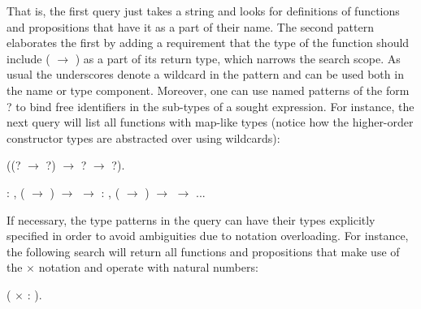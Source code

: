 That is, the first  query just takes a string and looks for
definitions of functions and propositions that have it as a part of
their name. The second pattern elaborates the first by adding a
requirement that the type of the function should include (\coqdocvar{\_} \ensuremath{\rightarrow} 
\coqdocvar{\_}) as a part of its return type, which narrows the search scope. As usual the
underscores \coqdocvar{\_} denote a wildcard in the pattern and can be used both
in the name or type component. Moreover, one can use named patterns of
the form ? to bind free identifiers in the sub-types of a sought
expression. For instance, the next query will list all functions with
map-like types (notice how the higher-order constructor types are
abstracted over using wildcards):
\begin{coqdoccode}
\coqdocemptyline
\coqdocnoindent
{} \coqdocvar{\_} ((? \ensuremath{\rightarrow} ?) \ensuremath{\rightarrow} \coqdocvar{\_} ? \ensuremath{\rightarrow} \coqdocvar{\_} ?).\coqdoceol
\end{coqdoccode}
\coqdoceol
\coqdocemptyline
\coqdocnoindent
{}  \coqdockw{\ensuremath{\forall}}   : , ( \ensuremath{\rightarrow} ) \ensuremath{\rightarrow}   \ensuremath{\rightarrow}  \coqdoceol
\coqdocnoindent
{}  \coqdockw{\ensuremath{\forall}}   : , ( \ensuremath{\rightarrow} ) \ensuremath{\rightarrow}   \ensuremath{\rightarrow}  \coqdoceol
\coqdocnoindent
...

\coqdocemptyline


If necessary, the type patterns in the query can have their types
explicitly specified in order to avoid ambiguities due to notation
overloading. For instance, the following search will return all
functions and propositions that make use of the \coqdocvar{\_} \ensuremath{\times} \coqdocvar{\_} notation and
operate with natural numbers: \begin{coqdoccode}
\coqdocemptyline
\coqdocnoindent
{} \coqdocvar{\_} (\coqdocvar{\_} \ensuremath{\times} \coqdocvar{\_} : ).\coqdoceol
\coqdocemptyline
\end{coqdoccode}


